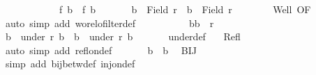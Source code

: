 \begin{isabellebody}
\ \ \ \ \ \ \ \ \ \ \ {\isacharasterisk}{\kern0pt}{\isacharasterisk}{\kern0pt}{\isacharasterisk}{\kern0pt}{\isacharcolon}{\kern0pt}\ {\isachardoublequoteopen}f\ b{}\ {\isacharequal}{\kern0pt}\ f\ b{}{\isachardoublequoteclose}\isanewline
\ \ \ \ \isamarkupfalse%
\ {}{}{\isacharcolon}{\kern0pt}\ {\isachardoublequoteopen}b{}\ {\isasymin}\ Field\ r\ {\isasymand}\ b{}\ {\isasymin}\ Field\ r{\isachardoublequoteclose}\isanewline
\ \ \ \ \isamarkupfalse%
\ {\isacharasterisk}{\kern0pt}\ {\isacharasterisk}{\kern0pt}{\isacharasterisk}{\kern0pt}\ Well\ OF\ \isamarkupfalse%
\ {\isacharparenleft}{\kern0pt}auto\ simp\ add{\isacharcolon}{\kern0pt}\ wo{\isacharunderscore}{\kern0pt}rel{\isachardot}{\kern0pt}ofilter{\isacharunderscore}{\kern0pt}def{\isacharparenright}{\kern0pt}\isanewline
\ \ \ \ \isamarkupfalse%
\isanewline
\ \ \ \ \isacommand{{\isacharbraceleft}{\kern0pt}}\isamarkupfalse%
\isamarkupfalse%
\ {\isachardoublequoteopen}{\isacharparenleft}{\kern0pt}b{}{\isacharcomma}{\kern0pt}b{}{\isacharparenright}{\kern0pt}\ {\isasymin}\ r{\isachardoublequoteclose}\isanewline
\ \ \ \ \ \isamarkupfalse%
\ {\isachardoublequoteopen}b{}\ {\isasymin}\ under\ r\ b{}\ {\isasymand}\ b{}\ {\isasymin}\ under\ r\ b{}{\isachardoublequoteclose}\isanewline
\ \ \ \ \ \isamarkupfalse%
\ under{\isacharunderscore}{\kern0pt}def\ \isamarkupfalse%
\ {}{}\ Refl\isanewline
\ \ \ \ \ \isamarkupfalse%
\ {\isacharparenleft}{\kern0pt}auto\ simp\ add{\isacharcolon}{\kern0pt}\ refl{\isacharunderscore}{\kern0pt}on{\isacharunderscore}{\kern0pt}def{\isacharparenright}{\kern0pt}\isanewline
\ \ \ \ \ \isamarkupfalse%
\ {\isachardoublequoteopen}b{}\ {\isacharequal}{\kern0pt}\ b{}{\isachardoublequoteclose}\ \isamarkupfalse%
\ BIJ\ {\isacharasterisk}{\kern0pt}\ {\isacharasterisk}{\kern0pt}{\isacharasterisk}{\kern0pt}\ {\isacharasterisk}{\kern0pt}{\isacharasterisk}{\kern0pt}{\isacharasterisk}{\kern0pt}\isanewline
\ \ \ \ \ \isamarkupfalse%
\ {\isacharparenleft}{\kern0pt}simp\ add{\isacharcolon}{\kern0pt}\ bij{\isacharunderscore}{\kern0pt}betw{\isacharunderscore}{\kern0pt}def\ inj{\isacharunderscore}{\kern0pt}on{\isacharunderscore}{\kern0pt}def{\isacharparenright}{\kern0pt}\isanewline
\ \ \ \ \isacommand{{\isacharbraceright}{\kern0pt}}\isamarkupfalse%

\end{isabellebody}
